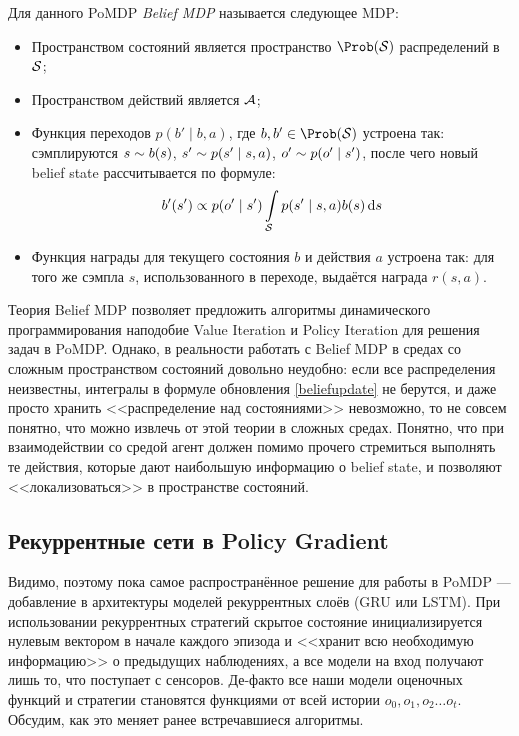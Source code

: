 \begin{definition}
Для данного PoMDP \emph{Belief MDP} называется следующее MDP:
\begin{itemize}
    \item Пространством состояний является пространство $\Prob(\St)$ распределений в $\mathcal{S}$;
    \item Пространством действий является $\mathcal{A}$;
    \item Функция переходов $p(b' \mid b, a)$, где $b, b' \in \Prob(\St)$ устроена так: сэмплируются $s \HM\sim b(s)$, $s' \HM\sim p(s' \HM\mid s, a)$, $o' \HM\sim p(o' \mid s')$, после чего новый belief state рассчитывается по формуле:
    $$b'(s') \propto p(o' \mid s')\int\limits_{\mathcal{S}} p(s' \mid s, a) b(s) \mathop{}\!\mathrm{d} s $$
    \item Функция награды для текущего состояния $b$ и действия $a$ устроена так: для того же сэмпла $s$, использованного в переходе, выдаётся награда $r(s, a)$.
\end{itemize}
\end{definition}

Теория Belief MDP позволяет предложить алгоритмы динамического программирования наподобие Value Iteration и Policy Iteration для решения задач в PoMDP. Однако, в реальности работать с Belief MDP в средах со сложным пространством состояний довольно неудобно: если все распределения неизвестны, интегралы в формуле обновления \eqref{beliefupdate} не берутся, и даже просто хранить <<распределение над состояниями>> невозможно, то не совсем понятно, что можно извлечь от этой теории в сложных средах. Понятно, что при взаимодействии со средой агент должен помимо прочего стремиться выполнять те действия, которые дают наибольшую информацию о belief state, и позволяют <<локализоваться>> в пространстве состояний.

\subsection{Рекуррентные сети в Policy Gradient}

Видимо, поэтому пока самое распространённое решение для работы в PoMDP --- добавление в архитектуры моделей рекуррентных слоёв (GRU или LSTM). При использовании рекуррентных стратегий скрытое состояние инициализируется нулевым вектором в начале каждого эпизода и <<хранит всю необходимую информацию>> о предыдущих наблюдениях, а все модели на вход получают лишь то, что поступает с сенсоров. Де-факто все наши модели оценочных функций и стратегии становятся функциями от всей истории $o_0, o_1, o_2 \dots o_t$. Обсудим, как это меняет ранее встречавшиеся алгоритмы.

